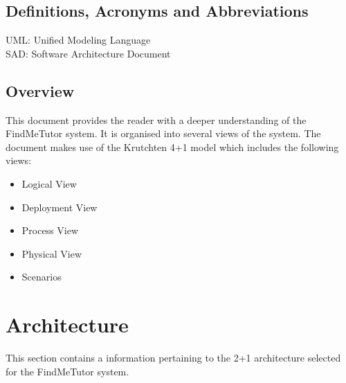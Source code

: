 \documentclass[12pt]{article}
\begin{document}
\subsection{Definitions, Acronyms and Abbreviations}
UML: Unified Modeling Language\\
SAD: Software Architecture Document\\

\subsection{Overview}
This document provides the reader with a deeper understanding of the FindMeTutor system. It is organised into several views of the system. The document makes use of the Krutchten 4+1 model which includes the following views:\\

\begin{itemize}
\item Logical View
\item Deployment View
\item Process View
\item Physical View
\item Scenarios
\end{itemize}

\pagebreak

\section{Architecture}
This section contains a information pertaining to the 2+1 architecture selected for the FindMeTutor system.
\end{document}
